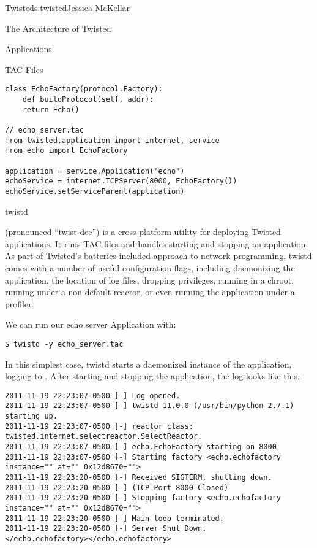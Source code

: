 \begin{aosachapter}{Twisted}{s:twisted}{Jessica McKellar}
\begin{aosasect1}{The Architecture of Twisted}
\begin{aosasect2}{Applications}
\begin{aosasect3}{TAC Files}
\begin{verbatim}
class EchoFactory(protocol.Factory):
    def buildProtocol(self, addr):
    return Echo()

// echo_server.tac
from twisted.application import internet, service
from echo import EchoFactory

application = service.Application("echo")
echoService = internet.TCPServer(8000, EchoFactory())
echoService.setServiceParent(application)
\end{verbatim}

\end{aosasect3}

\begin{aosasect3}{twistd}

 (pronounced ``twist-dee'') is a cross-platform utility for
deploying Twisted applications. It runs TAC files and handles starting and
stopping an application. As part of Twisted's batteries-included approach to
network programming, twistd comes with a number of useful configuration flags,
including daemonizing the application, the location of log files, dropping
privileges, running in a chroot, running under a non-default reactor, or even
running the application under a profiler.

We can run our echo server Application with:

\begin{verbatim}
$ twistd -y echo_server.tac
\end{verbatim}

In this simplest case, twistd starts a daemonized instance of the
application, logging to . After starting and stopping the
application, the log looks like this:

\begin{verbatim}
2011-11-19 22:23:07-0500 [-] Log opened.
2011-11-19 22:23:07-0500 [-] twistd 11.0.0 (/usr/bin/python 2.7.1) starting up.
2011-11-19 22:23:07-0500 [-] reactor class: twisted.internet.selectreactor.SelectReactor.
2011-11-19 22:23:07-0500 [-] echo.EchoFactory starting on 8000
2011-11-19 22:23:07-0500 [-] Starting factory <echo.echofactory instance="" at="" 0x12d8670="">
2011-11-19 22:23:20-0500 [-] Received SIGTERM, shutting down.
2011-11-19 22:23:20-0500 [-] (TCP Port 8000 Closed)
2011-11-19 22:23:20-0500 [-] Stopping factory <echo.echofactory instance="" at="" 0x12d8670="">
2011-11-19 22:23:20-0500 [-] Main loop terminated.
2011-11-19 22:23:20-0500 [-] Server Shut Down.
</echo.echofactory></echo.echofactory>
\end{verbatim}


\end{aosasect3}
\end{aosasect2}
\end{aosasect1}
\end{aosachapter}
